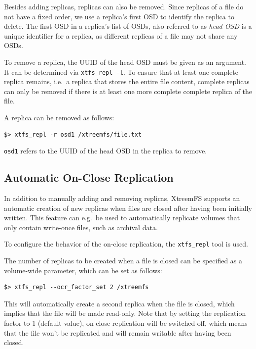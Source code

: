 \documentclass[a4paper,10pt]{book}
\begin{document}
Besides adding replicas, replicas can also be removed. Since replicas of a file do not have a fixed order, we use a replica's first OSD to identify the replica to delete. The first OSD in a replica's list of OSDs, also referred to as \emph{head OSD} is a unique identifier for a replica, as different replicas of a file may not share any OSDs.

To remove a replica, the UUID of the head OSD must be given as an argument. It can be determined via \texttt{xtfs\_repl -l}. To ensure that at least one complete replica remains, i.e.\ a replica that stores the entire file content, complete replicas can only be removed if there is at least one more complete complete replica of the file.

A replica can be removed as follows:

\begin{verbatim}
$> xtfs_repl -r osd1 /xtreemfs/file.txt
\end{verbatim}

\texttt{osd1} refers to the UUID of the head OSD in the replica to remove.


\subsection{Automatic On-Close Replication}

In addition to manually adding and removing replicas, XtreemFS supports an automatic creation of new replicas when files are closed after having been initially written. This feature can e.g.\ be used to automatically replicate volumes that only contain write-once files, such as archival data.

To configure the behavior of the on-close replication, the \texttt{xtfs\_repl} tool is used.

The number of replicas to be created when a file is closed can be specified as a volume-wide parameter, which can be set as follows:

\begin{verbatim}
$> xtfs_repl --ocr_factor_set 2 /xtreemfs
\end{verbatim}

This will automatically create a second replica when the file is closed, which implies that the file will be made read-only. Note that by setting the replication factor to 1 (default value), on-close replication will be switched off, which means that the file won't be replicated and will remain writable after having been closed.
\end{document}
